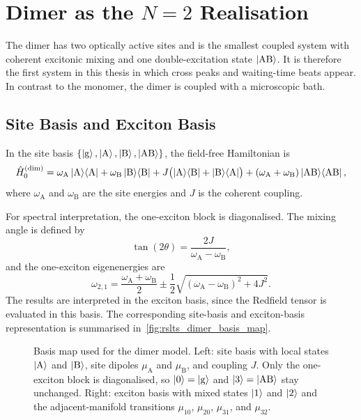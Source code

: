 \section{Dimer as the \texorpdfstring{$N=2$}{N=2} Realisation}
\label{sec:model_dimer}

The dimer has two optically active sites and is the smallest coupled system
with coherent excitonic mixing and one double-excitation state \(\ket{\mathrm{AB}}\).
It is therefore the first system in this thesis in which cross peaks and
waiting-time beats appear. In contrast to the monomer, the dimer is
coupled with a microscopic bath.

\subsection{Site Basis and Exciton Basis}

In the site basis \(\{\ket{\mathrm{g}},\ket{\mathrm{A}},\ket{\mathrm{B}},\ket{\mathrm{AB}}\}\), the
field-free Hamiltonian is
\begin{equation*}
\hat{H}_{0}^{(\mathrm{dim})}
=
\omega_{\mathrm{A}}\ket{\mathrm{A}}\!\bra{\mathrm{A}}
+
\omega_{\mathrm{B}}\ket{\mathrm{B}}\!\bra{\mathrm{B}}
+
J\bigl(\ket{\mathrm{A}}\!\bra{\mathrm{B}}+\ket{\mathrm{B}}\!\bra{\mathrm{A}}\bigr)
+
(\omega_{\mathrm{A}}+\omega_{\mathrm{B}})\ket{\mathrm{AB}}\!\bra{\mathrm{AB}},
\end{equation*}
where \(\omega_{\mathrm{A}}\) and \(\omega_{\mathrm{B}}\) are the site energies and \(J\) is the
coherent coupling.

For spectral interpretation, the one-exciton block is diagonalised. The mixing
angle is defined by
\begin{equation}
\tan(2\theta)=\frac{2J}{\omega_{\mathrm{A}}-\omega_{\mathrm{B}}},
\label{eq:dimer_mixing_angle}
\end{equation}
and the one-exciton eigenenergies are
\begin{equation}
\omega_{2,1}
=
\frac{\omega_{\mathrm{A}}+\omega_{\mathrm{B}}}{2}
\pm
\frac{1}{2}\sqrt{(\omega_{\mathrm{A}}-\omega_{\mathrm{B}})^2+4J^2}.
\label{eq:dimer_eigen_energies}
\end{equation}
The results are interpreted in the exciton basis, since the Redfield tensor is
evaluated in this basis. The corresponding site-basis and exciton-basis
representation is summarised in~\autoref{fig:rslts_dimer_basis_map}.

\begin{figure}[tbp]
    \centering
    \caption{Basis map used for the dimer model. Left: site basis with local states $\ket{\mathrm{A}}$ and $\ket{\mathrm{B}}$, site dipoles $\mu_{\mathrm{A}}$ and $\mu_{\mathrm{B}}$, and coupling $J$. Only the one-exciton block is diagonalised, so $\ket{0}=\ket{\mathrm{g}}$ and $\ket{3}=\ket{\mathrm{AB}}$ stay unchanged. Right: exciton basis with mixed states $\ket{1}$ and $\ket{2}$ and the adjacent-manifold transitions $\mu_{10}$, $\mu_{20}$, $\mu_{31}$, and $\mu_{32}$.}
    \label{fig:rslts_dimer_basis_map}
\end{figure}

